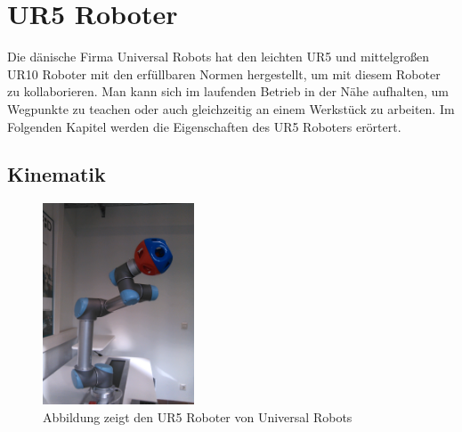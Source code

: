 \section{UR5 Roboter}
\label{sec:ur_robot_gru}

Die dänische Firma Universal Robots hat den leichten UR5 und mittelgroßen UR10 Roboter mit den erfüllbaren Normen hergestellt, um mit diesem Roboter zu kollaborieren. Man kann sich im laufenden Betrieb in der Nähe aufhalten, um Wegpunkte zu \acs{teachen} oder auch gleichzeitig an einem Werkstück zu arbeiten.
Im Folgenden Kapitel werden die Eigenschaften des UR5 Roboters erörtert.

\subsection{Kinematik}
\label{ur_eigenschaften_gru}

\begin{figure}[H]
  \centering
    \includegraphics[width=0.4\textwidth]{pic/ur5_robot.jpg}
      \caption[UR5 Roboter]{Abbildung zeigt den UR5 Roboter von Universal Robots}
      \label{fig:schnittstellen_schichten}
\end{figure}

